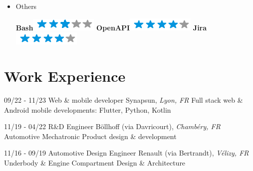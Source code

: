 \documentclass[]{friggeri-cv}
\begin{document}
\begin{flushright}
\begin{multicols}{3}
\begin{itemize}
\item Others \
\begin{flushright}

\textbf{Bash}\includegraphics[scale=0.40]{res/img/3stars.png}
\textbf{OpenAPI}\includegraphics[scale=0.40]{res/img/4stars.png}
\textbf{Jira}\includegraphics[scale=0.40]{res/img/4stars.png}
\end{flushright}            


        \end{itemize}
        \end{multicols}
        \end{flushright}
        \vspace*{-0.65cm}
\section{Work Experience}
\vspace*{-0.25cm}

\begin{entrylist}
  \entry
    {09/22 - 11/23}
    {Web \& mobile developer}
    {Synapsun, \textit{Lyon, FR}}
    {Full stack web \& Android mobile developments: \hspace*{8mm}Flutter, Python, Kotlin}
\end{entrylist}

\begin{entrylist}
  \entry
    {11/19 - 04/22}
    {R\&D Engineer}
    {Böllhoff (via Davricourt), \textit{Chambéry, FR}}
    {Automotive Mechatronic Product design \& development}
\end{entrylist}

\begin{entrylist}
  \entry
    {11/16 - 09/19}
    {Automotive Design Engineer}
    {Renault (via Bertrandt), \textit{Vélizy, FR}}
    {Underbody \& Engine Compartment Design \& Architecture}
\end{entrylist}

\vspace*{-0.5cm}
\vspace*{0.45cm}
\end{document}
